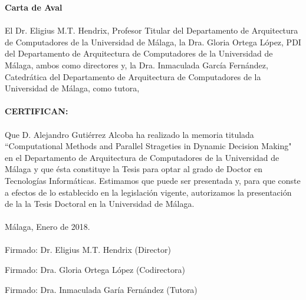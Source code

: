 \begin{abstractslongSpanish}

\textbf{Carta de Aval}\\
\\
El Dr. Eligius M.T. Hendrix, Profesor Titular del Departamento de Arquitectura de Computadores de la Universidad de M\'alaga,
la Dra. Gloria Ortega L\'opez, PDI del Departamento de Arquitectura de Computadores de la Universidad de M\'alaga, ambos como directores y,  
la Dra. Inmaculada Garc\'ia Fern\'andez, Catedr\'atica del Departamento de Arquitectura de Computadores de la Universidad de M\'alaga, como tutora, \\
\\
\textbf{CERTIFICAN:}\\
\\
Que D. Alejandro Guti\'errez Alcoba ha realizado la memoria titulada ``Computational Methods and Parallel Strageties in Dynamic Decision Making" en el Departamento de Arquitectura de Computadores de la Universidad de M\'alaga y que \'esta constituye la Tesis para optar al grado de Doctor en Tecnolog\'ias Inform\'aticas. Estimamos que puede ser presentada y, para que conste a efectos de lo establecido en la legislaci\'on vigente, autorizamos la presentaci\'on de la  la Tesis Doctoral en la Universidad de M\'alaga.\\
\\
M\'alaga, Enero de 2018.
\\
\\
Firmado: Dr. Eligius M.T. Hendrix (Director)
\vspace{2cm}

Firmado: Dra. Gloria Ortega L\'opez (Codirectora)
\vspace{2cm}

Firmado: Dra. Inmaculada Gar\'ia Fern\'andez (Tutora)


\end{abstractslongSpanish}

